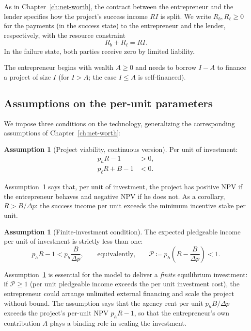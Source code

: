 \documentclass[11pt,a4paper,oneside]{book}
\def\leq{\leqslant}
\def\geq{\geqslant}
\theoremstyle{plain}
\theoremstyle{definition}
\newtheorem{assumption}[theorem]{Assumption}
\theoremstyle{remark}
\numberwithin{equation}{chapter}
\begin{document}
As in Chapter~\ref{ch:net-worth}, the contract between the entrepreneur and the lender specifies how the project's success income $R I$ is split.
We write $R_b, R_\ell \geq 0$ for the payments (in the success state) to the entrepreneur and the lender, respectively, with the resource constraint
\begin{equation}\label{eq:EM-sharing}
  R_b + R_\ell = R I.
\end{equation}
In the failure state, both parties receive zero by limited liability.

The entrepreneur begins with wealth $A \geq 0$ and needs to borrow $I - A$ to finance a project of size $I$ (for $I > A$; the case $I \leq A$ is self-financed).

\subsection{Assumptions on the per-unit parameters}

We impose three conditions on the technology, generalizing the corresponding assumptions of Chapter~\ref{ch:net-worth}:

\begin{assumption}[Project viability, continuous version]\label{ass:EM-viability}
Per unit of investment:
\begin{align}
  p_h R - 1 &> 0, \tag{V.1'}\label{eq:EM-NPV-h} \\
  p_\ell R + B - 1 &< 0. \tag{V.2'}\label{eq:EM-NPV-l}
\end{align}
\end{assumption}

Assumption~\ref{ass:EM-viability} says that, per unit of investment, the project has positive NPV if the entrepreneur behaves and negative NPV if he does not.
As a corollary, $R > B/\Delta p$: the success income per unit exceeds the minimum incentive stake per unit.

\begin{assumption}[Finite-investment condition]\label{ass:EM-finite}
The expected pledgeable income per unit of investment is strictly less than one:
\begin{equation}\label{eq:EM-finite}
  p_h R - 1 < p_h \frac{B}{\Delta p},
  \qquad \text{equivalently,} \qquad
  \mathcal{P} \coloneqq p_h \left( R - \frac{B}{\Delta p} \right) < 1.
\end{equation}
\end{assumption}

Assumption~\ref{ass:EM-finite} is essential for the model to deliver a \emph{finite} equilibrium investment: if $\mathcal{P} \geq 1$ (per unit pledgeable income exceeds the per unit investment cost), the entrepreneur could arrange unlimited external financing and scale the project without bound.
The assumption says that the agency rent per unit $p_h B / \Delta p$ exceeds the project's per-unit NPV $p_h R - 1$, so that the entrepreneur's own contribution $A$ plays a binding role in scaling the investment.
\end{document}
